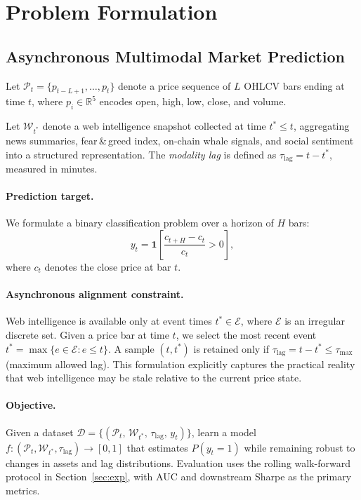 \section{Problem Formulation}
\label{sec:problem}

\subsection{Asynchronous Multimodal Market Prediction}

Let $\mathcal{P}_t = \{p_{t-L+1}, \ldots, p_t\}$ denote a price sequence of $L$ OHLCV bars ending at time $t$, where $p_i \in \mathbb{R}^5$ encodes open, high, low, close, and volume.

Let $\mathcal{W}_{t^*}$ denote a web intelligence snapshot collected at time $t^* \leq t$, aggregating news summaries, fear\,\&\,greed index, on-chain whale signals, and social sentiment into a structured representation.
The \emph{modality lag} is defined as $\tau_{\mathrm{lag}} = t - t^*$, measured in minutes.

\paragraph{Prediction target.}
We formulate a binary classification problem over a horizon of $H$ bars:
\[
y_t = \mathbf{1}\!\left[\frac{c_{t+H} - c_t}{c_t} > 0\right],
\]
where $c_t$ denotes the close price at bar $t$.

\paragraph{Asynchronous alignment constraint.}
Web intelligence is available only at event times $t^* \in \mathcal{E}$, where $\mathcal{E}$ is an irregular discrete set.
Given a price bar at time $t$, we select the most recent event $t^* = \max\{e \in \mathcal{E} : e \leq t\}$.
A sample $(t, t^*)$ is retained only if $\tau_{\mathrm{lag}} = t - t^* \leq \tau_{\max}$ (maximum allowed lag).
This formulation explicitly captures the practical reality that web intelligence may be stale relative to the current price state.

\paragraph{Objective.}
Given a dataset $\mathcal{D} = \{(\mathcal{P}_t,\, \mathcal{W}_{t^*},\, \tau_{\mathrm{lag}},\, y_t)\}$, learn a model $f: (\mathcal{P}_t, \mathcal{W}_{t^*}, \tau_{\mathrm{lag}}) \to [0,1]$ that estimates $P(y_t = 1)$ while remaining robust to changes in assets and lag distributions.
Evaluation uses the rolling walk-forward protocol in Section~\ref{sec:exp}, with AUC and downstream Sharpe as the primary metrics.
